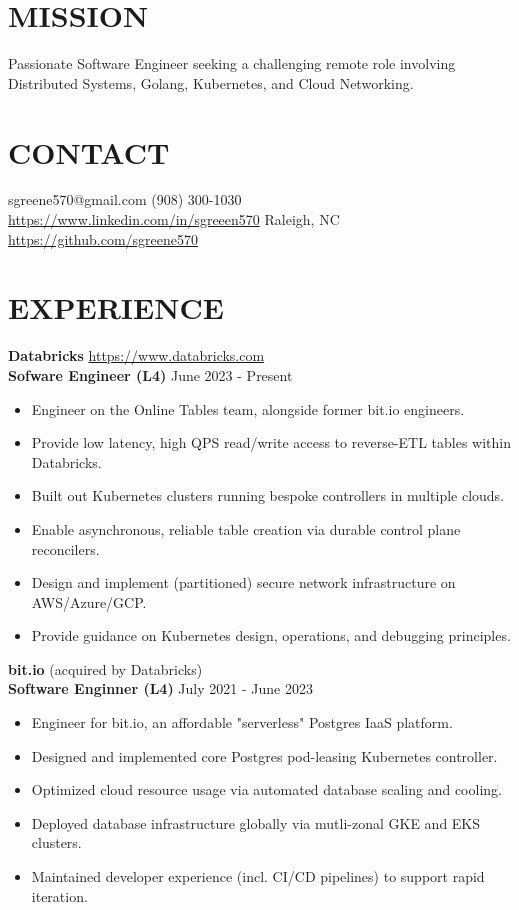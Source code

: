 \documentclass[line, margin, 10.5pt]{res}
\begin{document}

\begin{resume}

\section{\small MISSION}
Passionate Software Engineer seeking a challenging remote role involving Distributed Systems, Golang, Kubernetes, and Cloud Networking.

\section{\small CONTACT}
sgreene570@gmail.com \hfill (908) 300-1030 \\
\url{https://www.linkedin.com/in/sgreeen570} \hfill Raleigh, NC \\
\url{https://github.com/sgreene570}

\section{\small EXPERIENCE}
{\bf \large{Databricks}} \hfill \url{https://www.databricks.com} \\
{\bf Sofware Engineer (L4)} \hfill June 2023 - Present
\begin{itemize}
    \item Engineer on the Online Tables team, alongside former bit.io engineers.
    \item Provide low latency, high QPS read/write access to reverse-ETL tables within Databricks.
    \item Built out Kubernetes clusters running bespoke controllers in multiple clouds.
    \item Enable asynchronous, reliable table creation via durable control plane reconcilers.
    \item Design and implement (partitioned) secure network infrastructure on AWS/Azure/GCP.
    \item Provide guidance on Kubernetes design, operations, and debugging principles.
\end{itemize}

{\bf \large{bit.io}} \hfill (acquired by Databricks) \\
{\bf Software Enginner (L4)} \hfill July 2021 - June 2023
\begin{itemize}
    \item Engineer for bit.io, an affordable "serverless" Postgres IaaS platform.
    \item Designed and implemented core Postgres pod-leasing Kubernetes controller.
    \item Optimized cloud resource usage via automated database scaling and cooling.
    \item Deployed database infrastructure globally via mutli-zonal GKE and EKS clusters.
    \item Maintained developer experience (incl. CI/CD pipelines) to support rapid iteration.
\end{itemize}


\end{resume}
\end{document}

